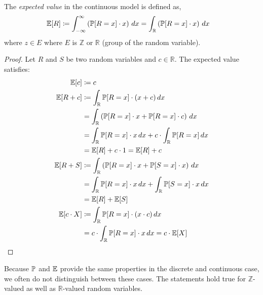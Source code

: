 \begin{definition}
  The \emph{expected value} in the continuous model is defined as,
  \begin{align}
    \mathbb E[R] &\coloneqq \int_{-\infty}^\infty \left(\mathbb P[R=x] \cdot x\right) \, dx
          = \int_{\mathbb R} \left(\mathbb P[R=x] \cdot x\right) \, dx
  \end{align}
  where $z \in E$ where $E$ is $\mathbb Z$ or $\mathbb R$ (group of the random variable).
\end{definition}
%
\begin{proof}
  Let $R$ and $S$ be two random variables and $c \in \mathbb R$.
  The expected value satisfies:
  \begin{align}
    \mathbb E[c]     &\coloneqq c \label{eq:Ec} \\
    \mathbb E[R + c] &\coloneqq \int_{\mathbb R} \mathbb P[R=x] \cdot (x + c) \, dx \notag\\
              &= \int_{\mathbb R} \left(\mathbb P[R=x] \cdot x + \mathbb P[R=x] \cdot c\right) \, dx \notag\\
              &= \int_{\mathbb R} \mathbb P[R=x] \cdot x \, dx + c \cdot \int_{\mathbb R} \mathbb P[R=x] \, dx \notag\\
              &= \mathbb E[R] + c \cdot 1 = \mathbb E[R] + c \\
    \mathbb E[R + S] &\coloneqq \int_{\mathbb R} \left(\mathbb P[R=x] \cdot x + \mathbb P[S=x] \cdot x\right) \, dx \notag\\
              &= \int_{\mathbb R} \mathbb P[R=x] \cdot x \, dx + \int_{\mathbb R} \mathbb P[S=x] \cdot x \, dx \notag\\
              &= \mathbb E[R] + \mathbb E[S] \label{eq:Evv} \\
    \mathbb E[c \cdot X] &\coloneqq \int_{\mathbb R} \mathbb P[R=x] \cdot (x \cdot c) \, dx \notag\\
              &= c \cdot \int_{\mathbb R} \mathbb P[R=x] \cdot x \, dx
              = c \cdot \mathbb E[X] \label{eq:Ecv}
  \end{align}
\end{proof}
Because $\mathbb P$ and $\mathbb E$ provide the same properties in the discrete and continuous case,
we often do not distinguish between these cases. The statements hold true for $\mathbb Z$-valued
as well as $\mathbb R$-valued random variables.

